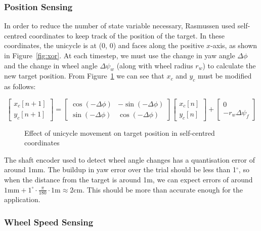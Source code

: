 \documentclass{IIBproject}
\begin{document}
\subsubsection{Position Sensing}

In order to reduce the number of state variable necessary, Rasmussen used
self-centred coordinates to keep track of the position of the target. In
these coordinates, the unicycle is at (0, 0) and faces along the positive
$x$-axis, as shown in Figure~\ref{fig:xor}. At each timestep, we must use the
change in yaw angle $\Delta\phi$ and the change in wheel angle
$\Delta\psi_w$ (along with wheel radius $r_w$) to calculate the new target
position. From Figure~\ref{fig:scc} we can see that $x_c$ and $y_c$ must be
modified as follows:

\[
\begin{bmatrix}
  x_c[n+1] \\
  y_c[n+1]
\end{bmatrix} =
\begin{bmatrix}
  \cos(-\Delta\phi) & -\sin(-\Delta\phi) \\
  \sin(-\Delta\phi) & \cos(-\Delta\phi)
\end{bmatrix}
\begin{bmatrix}
  x_c[n] \\
  y_c[n]
\end{bmatrix} +
\begin{bmatrix}
  0 \\ -r_w\Delta \psi_f
\end{bmatrix}
\]

\begin{figure}[htpb]
  \begin{center}
    \def\svgwidth{15cm}
    
    \end{center}
    \caption{Effect of unicycle movement on target position in self-centred
    coordinates}
    \label{fig:scc}
    \end{figure}

The shaft encoder used to detect wheel angle changes has a quantisation error
of around 1mm. The buildup in yaw error over the trial should be less than
1$^\circ$, so when the distance from the target is around 1m, we can expect
errors of around $1\textrm{mm} + 1^\circ \cdot \frac{\pi}{180} \cdot
1\textrm{m} \approx 2$cm.  This should be more than accurate enough for the
application.

\subsubsection{Wheel Speed Sensing}
\end{document}
